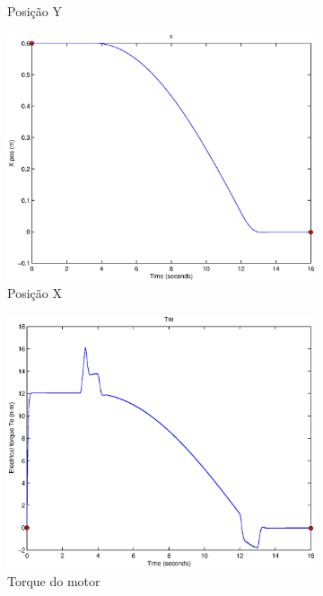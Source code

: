 \documentclass{article}
\begin{document}
\begin{figure}[H]
\begin{subfigure}{0.3\textwidth}
		\caption{Posição Y}
	\end{subfigure}
	\begin{subfigure}{0.3\textwidth}
		\includegraphics[width=\linewidth]{matlab/x4}
		\caption{Posição X}
	\end{subfigure}
	\begin{subfigure}{0.3\textwidth}
		\includegraphics[width=\linewidth]{matlab/tm4}
		\caption{Torque do motor}
	\end{subfigure}
	\begin{subfigure}{0.3\textwidth}

\end{subfigure}
\end{figure}
\end{document}
